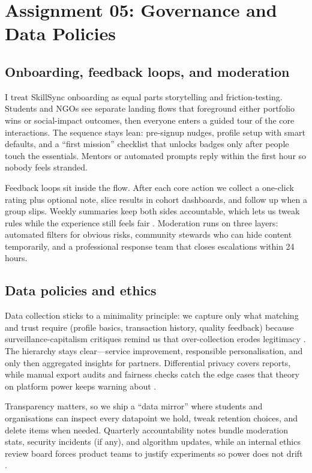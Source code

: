 \section*{Assignment 05: Governance and Data Policies}

\subsection*{Onboarding, feedback loops, and moderation}
I treat SkillSync onboarding as equal parts storytelling and friction-testing. Students and NGOs see separate landing flows that foreground either portfolio wins or social-impact outcomes, then everyone enters a guided tour of the core interactions. The sequence stays lean: pre-signup nudges, profile setup with smart defaults, and a ``first mission'' checklist that unlocks badges only after people touch the essentials. Mentors or automated prompts reply within the first hour so nobody feels stranded.

Feedback loops sit inside the flow. After each core action we collect a one-click rating plus optional note, slice results in cohort dashboards, and follow up when a group slips. Weekly summaries keep both sides accountable, which lets us tweak rules while the experience still feels fair \citep{Reillier2017}. Moderation runs on three layers: automated filters for obvious risks, community stewards who can hide content temporarily, and a professional response team that closes escalations within 24 hours.

\subsection*{Data policies and ethics}
Data collection sticks to a minimality principle: we capture only what matching and trust require (profile basics, transaction history, quality feedback) because surveillance-capitalism critiques remind us that over-collection erodes legitimacy \citep{Zuboff2019}. The hierarchy stays clear---service improvement, responsible personalisation, and only then aggregated insights for partners. Differential privacy covers reports, while manual export audits and fairness checks catch the edge cases that theory on platform power keeps warning about \citep{Srnicek2017}.

Transparency matters, so we ship a ``data mirror'' where students and organisations can inspect every datapoint we hold, tweak retention choices, and delete items when needed. Quarterly accountability notes bundle moderation stats, security incidents (if any), and algorithm updates, while an internal ethics review board forces product teams to justify experiments so power does not drift \citep{Choudary2016,Lecture10}.

